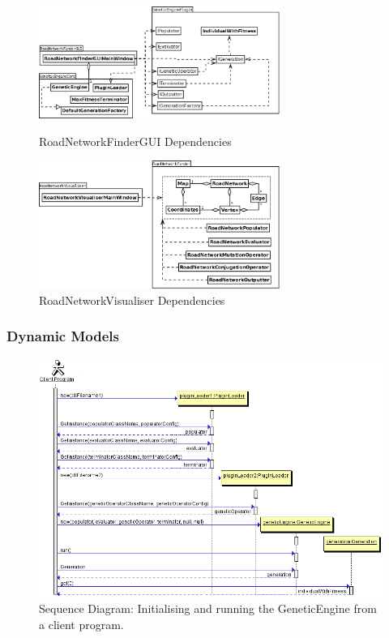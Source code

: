 \begin{figure}[ht!]
 \caption{RoadNetworkFinderGUI Dependencies}
 \centering
 \includegraphics[width=0.7\textwidth]{../RoadNetworkFinderGUI.png}\label{fig:RoadNetworkFinderGUIDependencies}
\end{figure}

\begin{figure}[ht!]
 \caption{RoadNetworkVisualiser Dependencies}\label{fig:RoadNetworkVisualiserDependencies}
 \centering
 \includegraphics[width=0.7\textwidth]{../RoadNetworkVisualiser.png}
\end{figure}

\clearpage

\subsubsection{Dynamic Models}
\begin{figure}[ht!]
 \caption{Sequence Diagram: Initialising and running the GeneticEngine from a client program.}
 \centering
 \includegraphics[width=\textwidth]{../Dynamic.png}
\end{figure}

